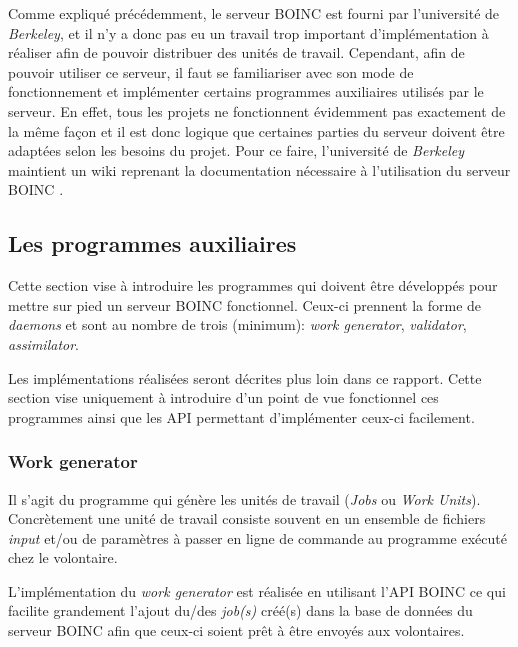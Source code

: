 \documentclass[a4paper, 11pt]{report}
\begin{document}
Comme expliqué précédemment, le serveur \textsc{BOINC} est fourni par l'université de \textit{Berkeley}, et il n'y a donc pas eu un travail trop important d'implémentation à réaliser afin de pouvoir distribuer des unités de travail. Cependant, afin de pouvoir utiliser ce serveur, il faut se familiariser avec son mode de fonctionnement et implémenter certains programmes auxiliaires utilisés par le serveur. En effet, tous les projets ne fonctionnent évidemment pas exactement de la même façon et il est donc logique que certaines parties du serveur doivent être adaptées selon les besoins du projet. Pour ce faire, l'université de \textit{Berkeley} maintient un wiki reprenant la documentation nécessaire à l'utilisation du serveur \textsc{BOINC} \cite{WIKI}.

\subsection{Les programmes auxiliaires}
\label{daemons}
Cette section vise à introduire les programmes qui doivent être développés pour mettre sur pied un serveur \textsc{BOINC} fonctionnel. Ceux-ci prennent la forme de \textit{daemons} et sont au nombre de trois (minimum): \textit{work generator}, \textit{validator}, \textit{assimilator}. 

Les implémentations réalisées seront décrites plus loin dans ce rapport. %
Cette section vise uniquement à introduire d'un point de vue fonctionnel ces programmes ainsi que les API permettant d'implémenter ceux-ci facilement.

\subsubsection{Work generator}
\label{workgeneratorboinc}
Il s'agit du programme qui génère les unités de travail (\textit{Jobs} ou \textit{Work Units}). Concrètement une unité de travail consiste souvent en un ensemble de fichiers \textit{input} et/ou de paramètres à passer en ligne de commande au programme exécuté chez le volontaire. 

L'implémentation du \textit{work generator} est réalisée en utilisant l'API \textsc{BOINC} ce qui facilite grandement l'ajout du/des \textit{job(s)} créé(s) dans la base de données du serveur \textsc{BOINC} afin que ceux-ci soient prêt à être envoyés aux volontaires.
\end{document}
